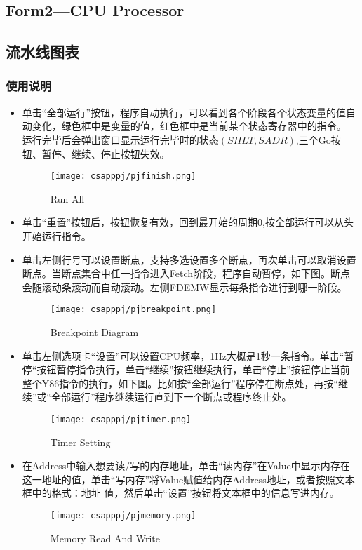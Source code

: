 \documentclass{article}
\begin{document}
\begin{spacing}{1.5}
\section{Form2---CPU Processor}
\subsection{流水线图表}
\subsubsection{使用说明}

\begin{normalsize}
\begin{itemize}
\begin{figure}[htbp]
\centering
\texttt{[image: csapppj/pjdiagram.png]}
\caption{Overall Pipeline Diagram}
\end{figure}
\item
单击“全部运行”按钮，程序自动执行，可以看到各个阶段各个状态变量的值自动变化，绿色框中是变量的值，红色框中是当前某个状态寄存器中的指令。
运行完毕后会弹出窗口显示运行完毕时的状态$\left( SHLT,SADR \right) $,三个Go按钮、暂停、继续、停止按钮失效。
\begin{figure}[htbp]
\centering
\texttt{[image: csapppj/pjfinish.png]}
\caption{Run All}
\end{figure}
\item
单击“重置”按钮后，按钮恢复有效，回到最开始的周期0,按全部运行可以从头开始运行指令。
\item
单击左侧行号可以设置断点，支持多选设置多个断点，再次单击可以取消设置断点。当断点集合中任一指令进入Fetch阶段，程序自动暂停，如下图。断点会随滚动条滚动而自动滚动。左侧FDEMW显示每条指令进行到哪一阶段。
\begin{figure}[htbp]
\centering
\texttt{[image: csapppj/pjbreakpoint.png]}
\caption{Breakpoint Diagram}
\end{figure}
\item
单击左侧选项卡“设置”可以设置CPU频率，1Hz大概是1秒一条指令。单击“暂停“按钮暂停指令执行，单击“继续”按钮继续执行，单击“停止”按钮停止当前整个Y86指令的执行，如下图。比如按“全部运行”程序停在断点处，再按“继续”或“全部运行”程序继续运行直到下一个断点或程序终止处。
\begin{figure}[htbp]
\centering
\texttt{[image: csapppj/pjtimer.png]}
\caption{Timer Setting}
\end{figure}
\item
在Address中输入想要读/写的内存地址，单击“读内存”在Value中显示内存在这一地址的值，单击“写内存”将Value赋值给内存Address地址，或者按照文本框中的格式：地址 值，然后单击“设置”按钮将文本框中的信息写进内存。
\begin{figure}[htbp]
\centering
\texttt{[image: csapppj/pjmemory.png]}
\caption{Memory Read And Write}
\end{figure}
\end{itemize}
\end{normalsize}

\end{spacing}
\end{document}
